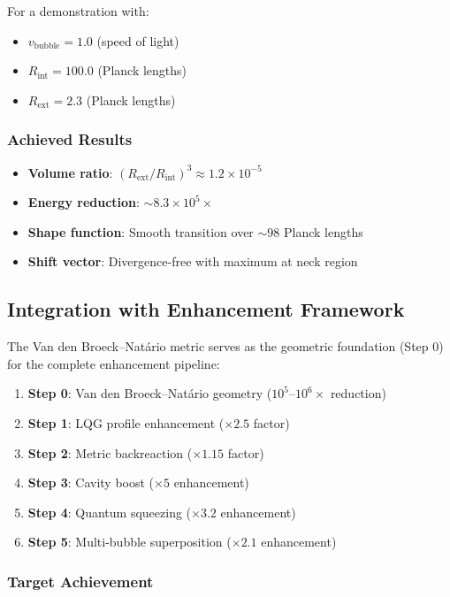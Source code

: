 For a demonstration with:
\begin{itemize}
\item $v_{\text{bubble}} = 1.0$ (speed of light)
\item $R_{\text{int}} = 100.0$ (Planck lengths)
\item $R_{\text{ext}} = 2.3$ (Planck lengths)
\end{itemize}

\subsubsection{Achieved Results}

\begin{itemize}
\item \textbf{Volume ratio}: $(R_{\text{ext}}/R_{\text{int}})^3 \approx 1.2 \times 10^{-5}$
\item \textbf{Energy reduction}: $\sim 8.3 \times 10^5\times$
\item \textbf{Shape function}: Smooth transition over $\sim 98$ Planck lengths
\item \textbf{Shift vector}: Divergence-free with maximum at neck region
\end{itemize}

\subsection{Integration with Enhancement Framework}

The Van den Broeck–Natário metric serves as the geometric foundation (Step 0) for the complete enhancement pipeline:

\begin{enumerate}
\item \textbf{Step 0}: Van den Broeck–Natário geometry ($10^5$--$10^6\times$ reduction)
\item \textbf{Step 1}: LQG profile enhancement ($\times 2.5$ factor)
\item \textbf{Step 2}: Metric backreaction ($\times 1.15$ factor)
\item \textbf{Step 3}: Cavity boost ($\times 5$ enhancement)
\item \textbf{Step 4}: Quantum squeezing ($\times 3.2$ enhancement)
\item \textbf{Step 5}: Multi-bubble superposition ($\times 2.1$ enhancement)
\end{enumerate}

\subsubsection{Target Achievement}

